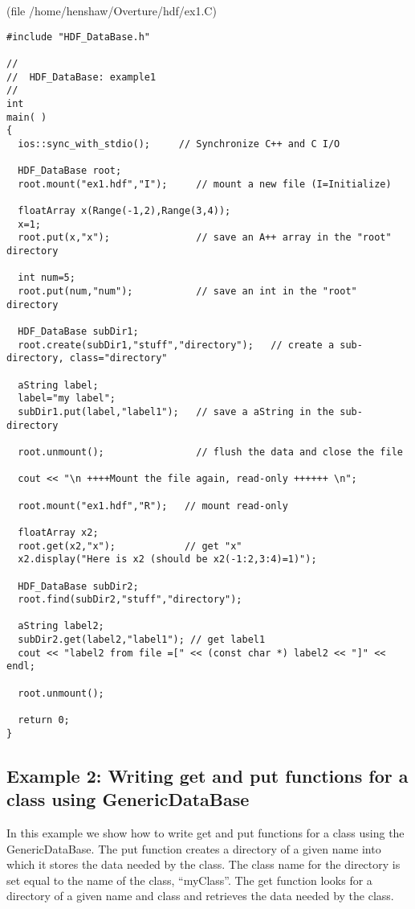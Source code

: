 \documentclass{article}
\begin{document}
(file {\ff /home/henshaw/Overture/hdf/ex1.C})
{\footnotesize
\begin{verbatim}
#include "HDF_DataBase.h"

//
//  HDF_DataBase: example1
//
int
main( ) 
{
  ios::sync_with_stdio();     // Synchronize C++ and C I/O 

  HDF_DataBase root;
  root.mount("ex1.hdf","I");     // mount a new file (I=Initialize)

  floatArray x(Range(-1,2),Range(3,4));
  x=1;
  root.put(x,"x");               // save an A++ array in the "root" directory

  int num=5;
  root.put(num,"num");           // save an int in the "root" directory
  
  HDF_DataBase subDir1;      
  root.create(subDir1,"stuff","directory");   // create a sub-directory, class="directory"

  aString label; 
  label="my label";
  subDir1.put(label,"label1");   // save a aString in the sub-directory  

  root.unmount();                // flush the data and close the file
    
  cout << "\n ++++Mount the file again, read-only ++++++ \n";

  root.mount("ex1.hdf","R");   // mount read-only

  floatArray x2;
  root.get(x2,"x");            // get "x"
  x2.display("Here is x2 (should be x2(-1:2,3:4)=1)");
    
  HDF_DataBase subDir2;
  root.find(subDir2,"stuff","directory");
    
  aString label2;
  subDir2.get(label2,"label1"); // get label1
  cout << "label2 from file =[" << (const char *) label2 << "]" << endl;

  root.unmount();

  return 0;
}

\end{verbatim}
}

\vfill\eject
\subsection{Example 2: Writing get and put functions for a class using GenericDataBase}

In this example we show how to write {\ff get} and {\ff put} functions for a class
using the {\ff GenericDataBase}.  The {\ff put } function creates a directory of
a given name into which it stores the data needed by the class. The class name for
the directory is set equal to the name of the class, ``myClass''. 
The {\ff get} function looks for a directory of a given name and class and retrieves
the data needed by the class.
\end{document}
